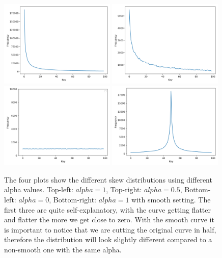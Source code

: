 \begin{figure}[!htb]
  \centering
  \includegraphics[width=0.49\textwidth,height=\textheight,keepaspectratio]{img/skew-alpha1.png}
  \includegraphics[width=0.49\textwidth,height=\textheight,keepaspectratio]{img/skew-alpha05.png}
  \includegraphics[width=0.49\textwidth,height=\textheight,keepaspectratio]{img/skew-alpha0.png}
  \includegraphics[width=0.49\textwidth,height=\textheight,keepaspectratio]{img/skew-alpha1smooth.png}
  \caption{ The four plots show the different skew distributions using different alpha values. Top-left: $alpha = 1$, Top-right: $alpha = 0.5$, Bottom-left: $alpha = 0$, Bottom-right: $alpha = 1$ with smooth setting. The first three are quite self-explanatory, with the curve getting flatter and flatter the more we get close to zero. With the smooth curve it is important to notice that we are cutting the original curve in half, therefore the distribution will look slightly different compared to a non-smooth one with the same alpha.}
  \label{fig:skews}
\end{figure}


